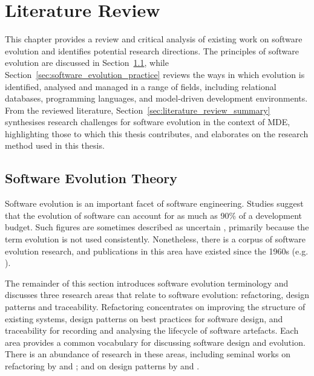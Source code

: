 
\chapter{Literature Review}
\label{LiteratureReview}
This chapter provides a review and critical analysis of existing work on software evolution and identifies potential research directions. The principles of software evolution are discussed in Section~\ref{sec:software_evolution_theory}, while Section~\ref{sec:software_evolution_practice} reviews the ways in which evolution is identified, analysed and managed in a range of fields, including relational databases, programming languages, and model-driven development environments. From the reviewed literature, Section~\ref{sec:literature_review_summary} synthesises research challenges for software evolution in the context of MDE, highlighting those to which this thesis contributes, and elaborates on the research method used in this thesis.

\section{Software Evolution Theory}
\label{sec:software_evolution_theory}
Software evolution is an important facet of software engineering. Studies \cite{erlikh00leveraging,moad90maintaining} suggest that the evolution of software can account for as much as 90\% of a development budget. Such figures are sometimes described as uncertain \cite[ch. 21]{sommerville06software}, primarily because the term evolution is not used consistently. Nonetheless, there is a corpus of software evolution research, and publications in this area have existed since the 1960s (e.g. \cite{lehman69programming}).

The remainder of this section introduces software evolution terminology and discusses three research areas that relate to software evolution: refactoring, design patterns and traceability. Refactoring concentrates on improving the structure of existing systems, design patterns on best practices for software design, and traceability for recording and analysing the lifecycle of software artefacts. Each area provides a common vocabulary for discussing software design and evolution. There is an abundance of research in these areas, including seminal works on refactoring by \cite{opdyke92refactoring} and \cite{fowler99refactoring}; and on design patterns by \cite{alexander77pattern} and \cite{gamma95patterns}.

